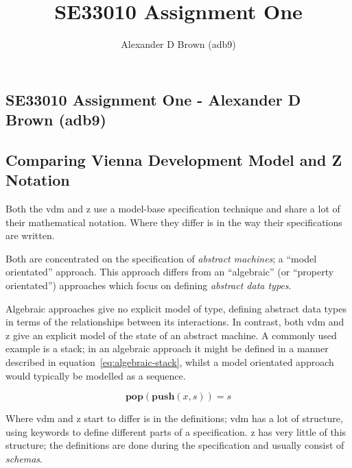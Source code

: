 \documentclass[a4paper, 10pt, notitlepage, fleqn]{article}
\title{SE33010 Assignment One}
\author{Alexander D Brown (adb9)}
\begin{document}
\begin{centering}
\section*{SE33010 Assignment One - Alexander D Brown (adb9)}
\subsection*{Comparing Vienna Development Model and Z Notation}
\end{centering}

Both the \gls{vdm} and \gls{z} use a model-base specification technique and share a lot of their 
mathematical notation. Where they differ is in the way their specifications are written.

Both are concentrated on the specification of \textit{abstract machines}; a ``model orientated'' 
approach. This approach differs from an ``algebraic'' (or ``property orientated'') approaches
which focus on defining \textit{abstract data types}\cite{Hayes93vdmz}.

Algebraic approaches give no explicit model of type, defining abstract data types in terms of the 
relationships between its interactions. In contrast, both \gls{vdm} and \gls{z} give an explicit 
model of the state of an abstract machine. A commonly used example is a stack; in an algebraic 
approach it might be defined in a manner described in equation~\ref{eq:algebraic-stack}, whilst
a model orientated approach would typically be modelled as a sequence.

\begin{equation}\label{eq:algebraic-stack}
\mathbf{pop}(\mathbf{push} (x,s)) = s
\end{equation}

Where \gls{vdm} and \gls{z} start to differ is in the definitions; \gls{vdm} has a lot of 
structure, using keywords to define different parts of a specification. \Gls{z} has very little of
this structure; the definitions are done during the specification and usually consist of
\textit{schemas}.



\end{document}
